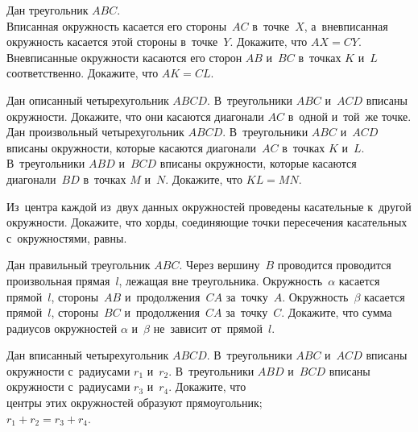 


\begin{problems}

\item
Дан треугольник $ABC$.
\\
\subproblem
Вписанная окружность касается его стороны~$AC$ в~точке~$X$, а~вневписанная
окружность касается этой стороны в~точке~$Y$.
Докажите, что $AX = CY$.
\\
\subproblem
Вневписанные окружности касаются его сторон $AB$ и~$BC$ в~точках $K$ и~$L$
соответственно.
Докажите, что $AK = CL$.

\item
\subproblem
Дан описанный четырехугольник $ABCD$.
В~треугольники $ABC$ и~$ACD$ вписаны окружности.
Докажите, что они касаются диагонали $AC$ в~одной и~той~же точке.
\\
\subproblem
Дан произвольный четырехугольник $ABCD$.
В~треугольники $ABC$ и~$ACD$ вписаны окружности, которые касаются
диагонали~$AC$ в~точках $K$ и~$L$.
В~треугольники $ABD$ и~$BCD$ вписаны окружности, которые касаются
диагонали~$BD$ в~точках $M$ и~$N$.
Докажите, что $KL = MN$.

\item
Из~центра каждой из~двух данных окружностей проведены касательные к~другой
окружности.
Докажите, что хорды, соединяющие точки пересечения касательных с~окружностями, 
равны.

\item
Дан правильный треугольник $ABC$.
Через вершину~$B$ проводится проводится произвольная прямая~$l$, лежащая вне
треугольника.
Окружность~$\alpha$ касается прямой~$l$, стороны~$AB$ и~продолжения~$CA$
за~точку~$A$.
Окружность~$\beta$ касается прямой~$l$, стороны~$BC$ и~продолжения~$CA$
за~точку~$C$.
Докажите, что сумма радиусов окружностей $\alpha$ и~$\beta$ не~зависит
от~прямой~$l$.

\item
Дан вписанный четырехугольник $ABCD$.
В~треугольники $ABC$ и~$ACD$ вписаны окружности с~радиусами $r_1$ и~$r_2$.
В~треугольники $ABD$ и~$BCD$ вписаны окружности с~радиусами $r_3$ и~$r_4$.
Докажите, что
\\
\subproblem центры этих окружностей образуют прямоугольник;
\\
\subproblem $r_1 + r_2 = r_3 + r_4$.


\end{problems}
